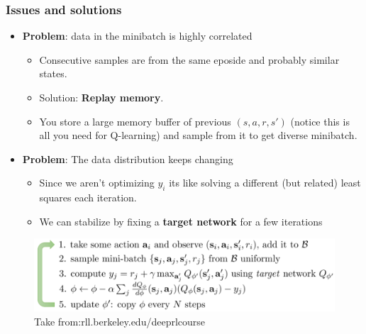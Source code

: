 \documentclass[handout]{beamer}
\renewcommand{\high}{\textbf}
\begin{document}
\begin{frame}\frametitle{Issues and solutions}\small

\begin{itemize}
	\item \high{Problem}: data in the minibatch is highly correlated
	\begin{itemize}
		\item Consecutive samples are from the same eposide and probably similar states.
		\item Solution: \high{Replay memory}.
		\item You store a large memory buffer of previous $(s,a,r,s')$ (notice this is all you need for Q-learning) and sample from it to get diverse minibatch.
	\end{itemize}
	\item \high{Problem}: The data distribution keeps changing
\begin{itemize}
	\item Since we aren't optimizing $y_i$ its like solving a different (but related) least squares each iteration.
	\item We can stabilize by fixing a \high{target network} for a few iterations 
\end{itemize}

\end{itemize}

	\begin{figure}
	\includegraphics[width=0.75\linewidth]{Figures/DQN}
	\vspace{-0.4cm}
	\caption{Take from:rll.berkeley.edu/deeprlcourse}
\end{figure}
\end{frame}
\end{document}
